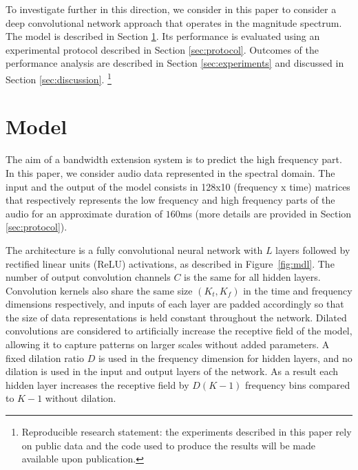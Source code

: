 \documentclass{article}
\begin{document}
To investigate further in this direction, we consider in this paper to consider a deep convolutional network approach that operates in the magnitude spectrum. The model is described in Section \ref{sec:model}. Its performance is evaluated using an experimental protocol described in Section \ref{sec:protocol}. Outcomes of the performance analysis are described in Section \ref{sec:experiments} and discussed in Section \ref{sec:discussion}. \footnote{Reproducible research statement: the experiments described in this paper rely on public data and the code used to produce the results will be made available upon publication.}

\section{Model}
\label{sec:model}

The aim of a bandwidth extension system is to predict the high frequency part. In this paper, we consider audio data represented in the spectral domain. The input and the output of the model consists in 128x10 (frequency x time) matrices that respectively represents the low frequency and high frequency parts of the audio for an approximate duration of $160$ms (more details are provided in Section \ref{sec:protocol}).

The architecture is a fully convolutional neural network \cite{long2015fully} with $L$ layers followed by rectified linear units (ReLU) activations, as described in Figure~\ref{fig:mdl}. The number of output convolution channels $C$ is the same for all hidden layers. Convolution kernels also share the same size $(K_t, K_f)$ in the time and frequency dimensions respectively, and inputs of each layer are padded accordingly so that the size of data representations is held constant throughout the network. Dilated convolutions \cite{yu2016multi, oord2016wavenet} are considered to artificially increase the receptive field of the model, allowing it to capture patterns on larger scales without added parameters. A fixed dilation ratio $D$ is used in the frequency dimension for hidden layers, and no dilation is used in the input and output layers of the network. As a result each hidden layer increases the receptive field by $D(K-1)$ frequency bins compared to $K-1$ without dilation.
\end{document}
